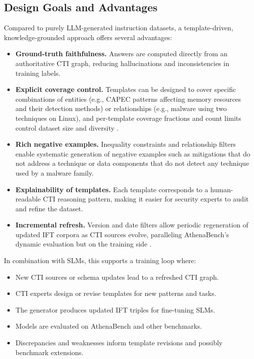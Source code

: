 \documentclass[unnumsec,webpdf,contemporary,large]{oup-authoring-template}
\theoremstyle{thmstyleone}
\theoremstyle{thmstyletwo}
\theoremstyle{thmstylethree}
\begin{document}
\subsection{Design Goals and Advantages}

Compared to purely LLM-generated instruction datasets, a template-driven, knowledge-grounded approach offers several advantages:

\begin{itemize}
  \item \textbf{Ground-truth faithfulness.} Answers are computed directly from an authoritative CTI graph, reducing hallucinations and inconsistencies in training labels.
  \item \textbf{Explicit coverage control.} Templates can be designed to cover specific combinations of entities (e.g., CAPEC patterns affecting memory resources and their detection methods) or relationships (e.g., malware using two techniques on Linux), and per-template coverage fractions and count limits control dataset size and diversity \cite{cardei2025ift}.
  \item \textbf{Rich negative examples.} Inequality constraints and relationship filters enable systematic generation of negative examples such as mitigations that do not address a technique or data components that do not detect any technique used by a malware family.
  \item \textbf{Explainability of templates.} Each template corresponds to a human-readable CTI reasoning pattern, making it easier for security experts to audit and refine the dataset.
  \item \textbf{Incremental refresh.} Version and date filters allow periodic regeneration of updated IFT corpora as CTI sources evolve, paralleling AthenaBench's dynamic evaluation but on the training side \cite{cardei2025ift,alam2025athenabench}.
\end{itemize}

In combination with SLMs, this supports a training loop where:

\begin{itemize}
  \item New CTI sources or schema updates lead to a refreshed CTI graph.
  \item CTI experts design or revise templates for new patterns and tasks.
  \item The generator produces updated IFT triples for fine-tuning SLMs.
  \item Models are evaluated on AthenaBench and other benchmarks.
  \item Discrepancies and weaknesses inform template revisions and possibly benchmark extensions.
\end{itemize}
\end{document}
